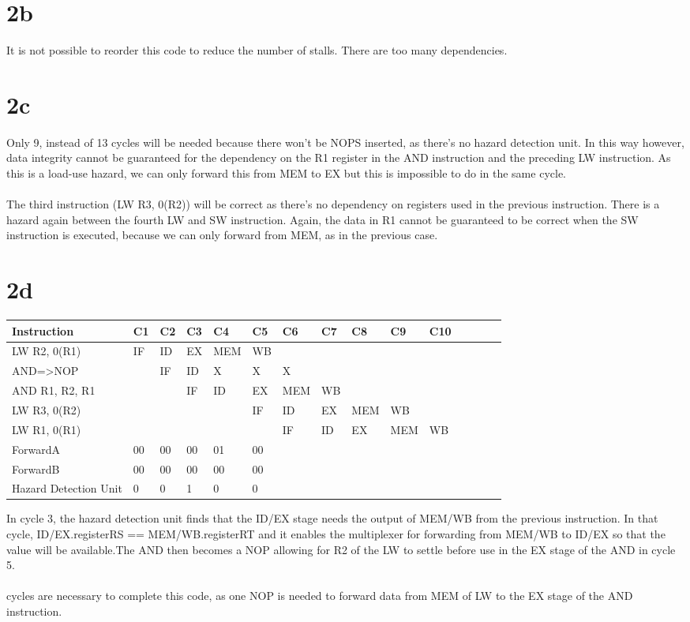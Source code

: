 \documentclass[10pt,a4paper]{article}
\begin{document}
\section*{2b}
It is not possible to reorder this code to reduce the number of stalls. There are too many dependencies.
\section*{2c}
Only 9, instead of 13 cycles will be needed because there won't be NOPS inserted, as there's no hazard detection unit. In this way however, data integrity cannot be guaranteed for the dependency on the R1 register in the AND instruction and the preceding LW instruction. As this is a load-use hazard, we can only forward this from MEM to EX but this is impossible to do in the same cycle.\\\\
The third instruction (LW R3, 0(R2)) will be correct as there's no dependency on registers used in the previous instruction. There is a hazard again between the fourth LW and SW instruction. Again, the data in R1 cannot be guaranteed to be correct when the SW instruction is executed, because we can only forward from MEM, as in the previous case. 
\section*{2d}
\begin{table}[h]
	\centering
	\label{my-label}
	\begin{tabular}{|l|l|l|l|l|l|l|l|l|l|l|l|l|l|l|}
		\hline
		Instruction &C1&C2&C3&C4&C5&C6&C7&C8&C9&C10 \\ \hline
		LW R2, 0(R1) & IF  & ID  & EX  & MEM  & WB  &  &  &  &  &     \\ \hline
		AND=>NOP &  &  IF& ID & X  & X & X &  &  &  &          \\ \hline
		AND R1, R2, R1 &  &  & IF & ID& EX  & MEM  & WB&  &  &        \\ \hline
		LW R3, 0(R2)&  &  &  &  &  IF & ID  & EX & MEM & WB &         \\ \hline
		LW R1, 0(R1)&  &  &  &  &  & IF & ID & EX & MEM  & WB       \\ \hline	 \hline
			ForwardA&00 &00 &00&01 &00&  &&&&     \\ \hline
				ForwardB&  00& 00 &00  &00  & 00  &&&&&   \\ \hline
					Hazard Detection Unit&  0& 0 & 1  & 0 & 0   &&&&&  \\ \hline
	\end{tabular}
\end{table}
\noindent In cycle 3, the hazard detection unit finds that the ID/EX stage needs the output of MEM/WB from the previous instruction. In that cycle, ID/EX.registerRS == MEM/WB.registerRT and it enables the multiplexer for forwarding from MEM/WB to ID/EX so that the value will be available.The AND then becomes a NOP allowing for R2 of the LW to settle before use in the EX stage of the AND in cycle 5.
\\\\
 cycles are necessary to complete this code, as one NOP is needed to forward data from MEM of LW to the EX stage of the AND instruction.
\end{document}
